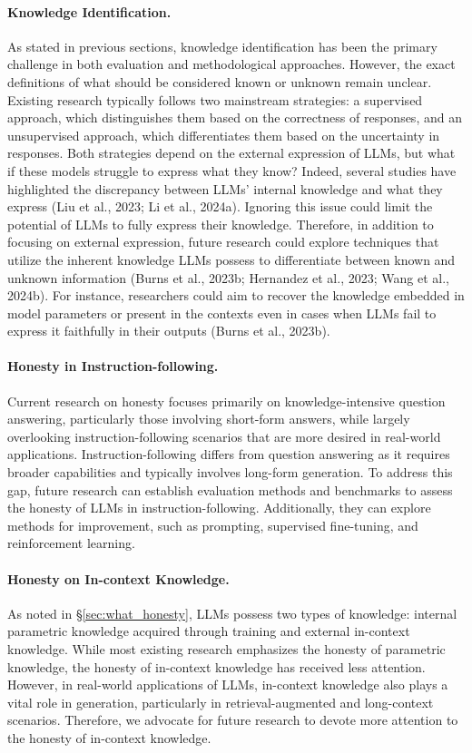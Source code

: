 \paragraph{Knowledge Identification.} As stated in previous sections, knowledge identification has been the primary challenge in both evaluation and methodological approaches. However, the exact definitions of what should be considered known or unknown remain unclear. Existing research typically follows two mainstream strategies: a supervised approach, which distinguishes them based on the correctness of responses, and an unsupervised approach, which differentiates them based on the uncertainty in responses. Both strategies depend on the external expression of LLMs, but what if these models struggle to express what they know? Indeed, several studies have highlighted the discrepancy between LLMs' internal knowledge and what they express (Liu et al., 2023; Li et al., 2024a). Ignoring this issue could limit the potential of LLMs to fully express their knowledge. Therefore, in addition to focusing on external expression, future research could explore techniques that utilize the inherent knowledge LLMs possess to differentiate between known and unknown information (Burns et al., 2023b; Hernandez et al., 2023; Wang et al., 2024b). For instance, researchers could aim to recover the knowledge embedded in model parameters or present in the contexts even in cases when LLMs fail to express it faithfully in their outputs (Burns et al., 2023b).

\paragraph{Honesty in Instruction-following.} Current research on honesty focuses primarily on knowledge-intensive question answering, particularly those involving short-form answers, while largely overlooking instruction-following scenarios that are more desired in real-world applications. Instruction-following differs from question answering as it requires broader capabilities and typically involves long-form generation. To address this gap, future research can establish evaluation methods and benchmarks to assess the honesty of LLMs in instruction-following. Additionally, they can explore methods for improvement, such as prompting, supervised fine-tuning, and reinforcement learning.

\paragraph{Honesty on In-context Knowledge.} As noted in \S\ref{sec:what_honesty}, LLMs possess two types of knowledge: internal parametric knowledge acquired through training and external in-context knowledge. While most existing research emphasizes the honesty of parametric knowledge, the honesty of in-context knowledge has received less attention. However, in real-world applications of LLMs, in-context knowledge also plays a vital role in generation, particularly in retrieval-augmented and long-context scenarios. Therefore, we advocate for future research to devote more attention to the honesty of in-context knowledge.

